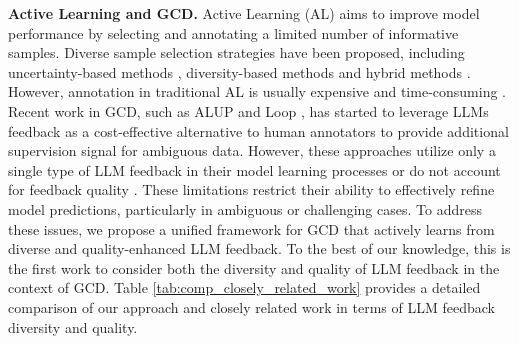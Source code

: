 \noindent \textbf{Active Learning and GCD. }
Active Learning (AL) \cite{ren2021survey, Ma2024ActiveGC} aims to improve model performance by selecting and annotating a limited number of informative samples. Diverse sample selection strategies have been proposed, including uncertainty-based methods \cite{wang2014new, zhang-etal-2023-clusterllm}, diversity-based methods \cite{sener2017active, Ash2020Deep} and hybrid methods \cite{agarwal2020contextual, huang2010active}. However, annotation in traditional AL is usually expensive and time-consuming \cite{cheng-etal-2023-improving, zhang-etal-2023-clusterllm}. Recent work in GCD, such as ALUP \cite{an-etal-2024-generalized} and Loop \cite{liang-etal-2024-actively}, has started to leverage LLMs feedback as a cost-effective alternative to human annotators to provide additional supervision signal for ambiguous data. However, these approaches utilize only a single type of LLM feedback in their model learning processes or do not account for feedback quality \cite{an-etal-2024-generalized, liang-etal-2024-actively, liang-etal-2024-synergizing}. These limitations restrict their ability to effectively refine model predictions, particularly in ambiguous or challenging cases. To address these issues, we propose a unified framework for GCD that actively learns from diverse and quality-enhanced LLM feedback. To the best of our knowledge, this is the first work to consider both the diversity and quality of LLM feedback in the context of GCD. Table \ref{tab:comp_closely_related_work} provides a detailed comparison of our approach and closely related work in terms of LLM feedback diversity and quality.






